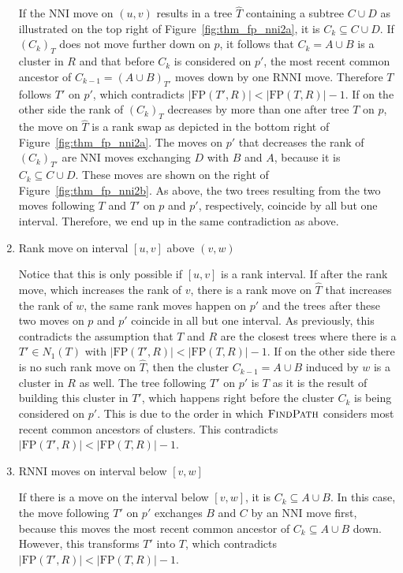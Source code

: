 \documentclass{amsart}
\newcommand{\rnni}{\mathrm{RNNI}}
\newcommand{\findpath}{\textsc{FindPath}}
\newcommand{\nni}{\mathrm{NNI}}
\newcommand{\fp}{\mathrm{FP}}
\begin{document}
\begin{enumerate}
If the $\nni$ move on $(u,v)$ results in a tree $\hat T$ containing a subtree $C \cup D$ as illustrated on the top right of Figure~\ref{fig:thm_fp_nni2a}, it is $C_k \subseteq C \cup D$.
If $(C_k)_T$ does not move further down on $p$, it follows that $C_k = A \cup B$ is a cluster in $R$ and that before $C_k$ is considered on $p'$, the most recent common ancestor of $C_{k-1} = (A \cup B)_{T'}$ moves down by one $\rnni$ move.
Therefore $T$ follows $T'$ on $p'$, which contradicts $|\fp(T',R)| < |\fp(T,R)| - 1$.
If on the other side the rank of $(C_k)_T$ decreases by more than one after tree $T$ on $p$, the move on $\hat T$ is a rank swap as depicted in the bottom right of Figure~\ref{fig:thm_fp_nni2a}.
The moves on $p'$ that decreases the rank of $(C_k)_{T'}$ are $\nni$ moves exchanging $D$ with $B$ and $A$, because it is $C_k \subseteq C \cup D$.
These moves are shown on the right of Figure~\ref{fig:thm_fp_nni2b}.
As above, the two trees resulting from the two moves following $T$ and $T'$ on $p$ and $p'$, respectively, coincide by all but one interval.
Therefore, we end up in the same contradiction as above.

\item Rank move on interval $[u,v]$ above $(v,w)$

Notice that this is only possible if $[u,v]$ is a rank interval.
If after the rank move, which increases the rank of $v$, there is a rank move on $\hat T$ that increases the rank of $w$, the same rank moves happen on $p'$ and the trees after these two moves on $p$ and $p'$ coincide in all but one interval.
As previously, this contradicts the assumption that $T$ and $R$ are the closest trees where there is a $T' \in N_1(T)$ with $|\fp(T',R)| < |\fp(T,R)| - 1$.
If on the other side there is no such rank move on $\hat T$, then the cluster $C_{k-1} = A \cup B$ induced by $w$ is a cluster in $R$ as well.
The tree following $T'$ on $p'$ is $T$ as it is the result of building this cluster in $T'$, which happens right before the cluster $C_k$ is being considered on $p'$.
This is due to the order in which $\findpath$ considers most recent common ancestors of clusters.
This contradicts $|\fp(T',R)| < |\fp(T,R)| - 1$.

\item $\rnni$ moves on interval below $[v,w]$

If there is a move on the interval below $[v,w]$, it is $C_k \subseteq A \cup B$.
In this case, the move following $T'$ on $p'$ exchanges $B$ and $C$ by an $\nni$ move first, because this moves the most recent common ancestor of $C_k \subseteq A \cup B$ down.
However, this transforms $T'$ into $T$, which contradicts $|\fp(T',R)| < |\fp(T,R)| - 1$.
\end{enumerate}
\end{document}
